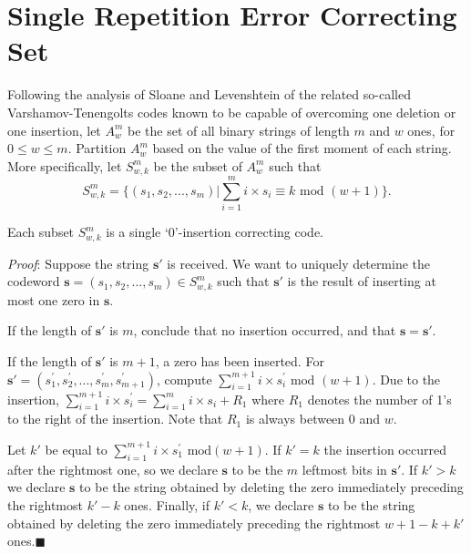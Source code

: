 \section{Single Repetition Error Correcting Set}\label{one}
Following the analysis of Sloane \cite{sloane:00} and Levenshtein
\cite{lev:66} of the related so-called Varshamov-Tenengolts codes
\cite{vt:65} known to be capable of overcoming one deletion or one
insertion, let $A_w^m$ be the set of all binary strings of length
$m$ and $w$ ones, for $0 \leq w \leq m$. Partition $A_w^m$ based
on the value of the first moment of each string. More
specifically, let $S_{w,k}^m$ be the subset of $A_w^m$ such that
\begin{equation}\label{s1}S_{w,k}^m=\{(s_1,s_2,...,s_m)| \sum_{i=1}^m
i \times s_i \equiv k \text{ mod } (w+1)\}.\end{equation}

\begin{lemma}Each subset $S_{w,k}^m$ is a single `0'-insertion correcting
code.\end{lemma} \textit{Proof}: Suppose the string $\mathbf{s'}$
is received. We want to uniquely determine the codeword
$\mathbf{s}=(s_1,s_2,...,s_m) \in S_{w,k}^m$ such that
$\mathbf{s'}$ is the result of inserting at most one zero in
$\mathbf{s}$.

If the length of $\mathbf{s'}$ is $m$, conclude that no insertion
occurred, and that $\mathbf{s}=\mathbf{s'}$.

If the length of $\mathbf{s'}$ is $m+1$, a zero has been inserted.
For $\mathbf{s'}=(s_1^{'},s_2^{'},...,s_m^{'},s_{m+1}^{'})$,
compute $\sum_{i=1}^{m+1} i \times s_i^{'} \text{ mod } (w+1)$.
Due to the insertion, $\sum_{i=1}^{m+1} i \times s_i^{'}=
\sum_{i=1}^{m} i \times s_i + R_1$ where $R_1$ denotes the number
of 1's to the right of the insertion. Note that $R_1$ is always
between $0$ and $w$.

Let $k'$ be equal to $\sum_{i=1}^{m+1} i \times s_1^{'} \text{ mod
} (w+1)$. If $k'=k$ the insertion occurred after the rightmost
one, so we declare $\mathbf{s}$ to be the $m$ leftmost bits in
$\mathbf{s'}$. If $k'>k$ we declare $\mathbf{s}$ to be the string
obtained by deleting the zero immediately preceding the rightmost
$k'-k$ ones.  Finally, if $k'< k$, we declare $\mathbf{s}$ to be
the string obtained by deleting the zero immediately preceding the
rightmost $w+1-k+k'$ ones.\hfill$\blacksquare$

